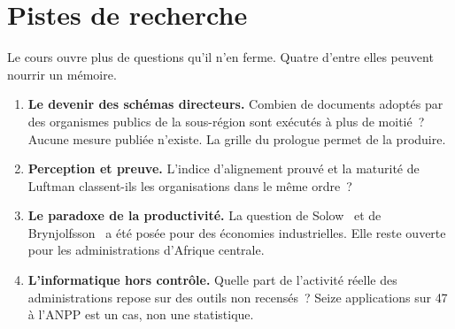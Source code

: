 \section{Pistes de recherche}
\label{sec:c16-recherche}

Le cours ouvre plus de questions qu'il n'en ferme. Quatre d'entre elles peuvent nourrir un mémoire.

\begin{enumerate}
    \item \textbf{Le devenir des schémas directeurs.} Combien de documents adoptés par des organismes publics
          de la sous-région sont exécutés à plus de moitié~? Aucune mesure publiée n'existe. La grille du
          prologue permet de la produire.
    \item \textbf{Perception et preuve.} L'indice d'alignement prouvé et la maturité de Luftman
          classent-ils les organisations dans le même ordre~?
    \item \textbf{Le paradoxe de la productivité.} La question de Solow~\cite{solow1987} et de
          Brynjolfsson~\cite{brynjolfsson1993} a été posée pour des économies industrielles. Elle reste
          ouverte pour les administrations d'Afrique centrale.
    \item \textbf{L'informatique hors contrôle.} Quelle part de l'activité réelle des administrations repose
          sur des outils non recensés~? Seize applications sur 47 à l'ANPP est un cas, non une statistique.
\end{enumerate}

